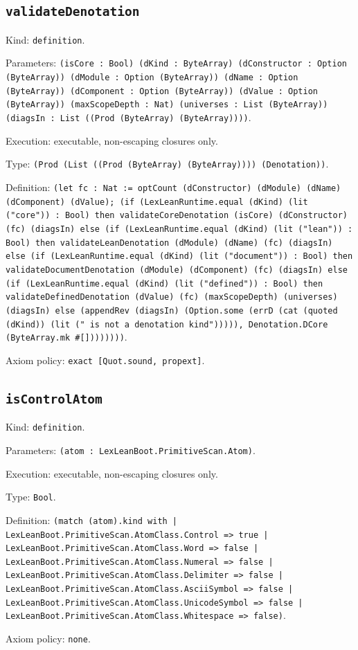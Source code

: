 \documentclass[11pt]{article}
\begin{document}
\subsection*{\texttt{validateDenotation}}
\noindent Kind: \texttt{definition}.\par
\noindent Parameters: \texttt{(isCore : Bool) (dKind : ByteArray) (dConstructor : Option (ByteArray)) (dModule : Option (ByteArray)) (dName : Option (ByteArray)) (dComponent : Option (ByteArray)) (dValue : Option (ByteArray)) (maxScopeDepth : Nat) (universes : List (ByteArray)) (diagsIn : List ((Prod (ByteArray) (ByteArray))))}.\par
\noindent Execution: executable, non-escaping closures only.\par
\noindent Type: \texttt{(Prod (List ((Prod (ByteArray) (ByteArray)))) (Denotation))}.\par
\noindent Definition: \texttt{(let fc : Nat := optCount (dConstructor) (dModule) (dName) (dComponent) (dValue); (if (LexLeanRuntime.equal (dKind) (lit ("core")) : Bool) then validateCoreDenotation (isCore) (dConstructor) (fc) (diagsIn) else (if (LexLeanRuntime.equal (dKind) (lit ("lean")) : Bool) then validateLeanDenotation (dModule) (dName) (fc) (diagsIn) else (if (LexLeanRuntime.equal (dKind) (lit ("document")) : Bool) then validateDocumentDenotation (dModule) (dComponent) (fc) (diagsIn) else (if (LexLeanRuntime.equal (dKind) (lit ("defined")) : Bool) then validateDefinedDenotation (dValue) (fc) (maxScopeDepth) (universes) (diagsIn) else (appendRev (diagsIn) (Option.some (errD (cat (quoted (dKind)) (lit (" is not a denotation kind"))))), Denotation.DCore (ByteArray.mk \#[])))))))}.\par
\noindent Axiom policy: \texttt{exact [Quot.sound, propext]}.\par
\subsection*{\texttt{isControlAtom}}
\noindent Kind: \texttt{definition}.\par
\noindent Parameters: \texttt{(atom : LexLeanBoot.PrimitiveScan.Atom)}.\par
\noindent Execution: executable, non-escaping closures only.\par
\noindent Type: \texttt{Bool}.\par
\noindent Definition: \texttt{(match (atom).kind with | LexLeanBoot.PrimitiveScan.AtomClass.Control => true | LexLeanBoot.PrimitiveScan.AtomClass.Word => false | LexLeanBoot.PrimitiveScan.AtomClass.Numeral => false | LexLeanBoot.PrimitiveScan.AtomClass.Delimiter => false | LexLeanBoot.PrimitiveScan.AtomClass.AsciiSymbol => false | LexLeanBoot.PrimitiveScan.AtomClass.UnicodeSymbol => false | LexLeanBoot.PrimitiveScan.AtomClass.Whitespace => false)}.\par
\noindent Axiom policy: \texttt{none}.\par
\end{document}
